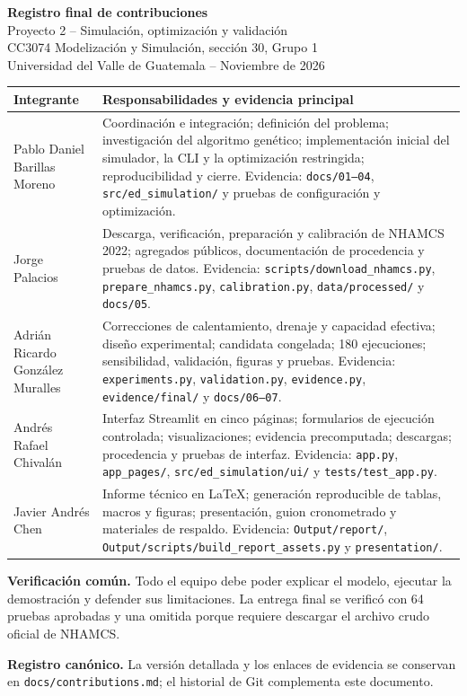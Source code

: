 \documentclass[10pt,a4paper]{article}
\begin{document}
\begin{center}
{\LARGE\bfseries Registro final de contribuciones}\\[6pt]
{\large Proyecto 2 -- Simulación, optimización y validación}\\[4pt]
CC3074 Modelización y Simulación, sección 30, Grupo 1\\
Universidad del Valle de Guatemala -- Noviembre de 2026
\end{center}

\vspace{8pt}
\small
\begin{tabularx}{\linewidth}{@{}>{\raggedright\arraybackslash}p{3.5cm} X@{}}
\toprule
\textbf{Integrante} & \textbf{Responsabilidades y evidencia principal} \\
\midrule
Pablo Daniel Barillas Moreno & Coordinación e integración; definición del problema; investigación del algoritmo genético; implementación inicial del simulador, la CLI y la optimización restringida; reproducibilidad y cierre. Evidencia: \texttt{docs/01--04}, \texttt{src/ed\_simulation/} y pruebas de configuración y optimización. \\
\addlinespace
Jorge Palacios & Descarga, verificación, preparación y calibración de NHAMCS 2022; agregados públicos, documentación de procedencia y pruebas de datos. Evidencia: \texttt{scripts/download\_nhamcs.py}, \texttt{prepare\_nhamcs.py}, \texttt{calibration.py}, \texttt{data/processed/} y \texttt{docs/05}. \\
\addlinespace
Adrián Ricardo González Muralles & Correcciones de calentamiento, drenaje y capacidad efectiva; diseño experimental; candidata congelada; 180 ejecuciones; sensibilidad, validación, figuras y pruebas. Evidencia: \texttt{experiments.py}, \texttt{validation.py}, \texttt{evidence.py}, \texttt{evidence/final/} y \texttt{docs/06--07}. \\
\addlinespace
Andrés Rafael Chivalán & Interfaz Streamlit en cinco páginas; formularios de ejecución controlada; visualizaciones; evidencia precomputada; descargas; procedencia y pruebas de interfaz. Evidencia: \texttt{app.py}, \texttt{app\_pages/}, \texttt{src/ed\_simulation/ui/} y \texttt{tests/test\_app.py}. \\
\addlinespace
Javier Andrés Chen & Informe técnico en LaTeX; generación reproducible de tablas, macros y figuras; presentación, guion cronometrado y materiales de respaldo. Evidencia: \texttt{Output/report/}, \texttt{Output/scripts/build\_report\_assets.py} y \texttt{presentation/}. \\
\bottomrule
\end{tabularx}

\vfill
\textbf{Verificación común.} Todo el equipo debe poder explicar el modelo, ejecutar la demostración y defender sus limitaciones. La entrega final se verificó con 64 pruebas aprobadas y una omitida porque requiere descargar el archivo crudo oficial de NHAMCS.

\textbf{Registro canónico.} La versión detallada y los enlaces de evidencia se conservan en \texttt{docs/contributions.md}; el historial de Git complementa este documento.
\end{document}
